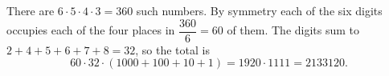 There are $6\cdot5\cdot4\cdot3=360$ such numbers. By symmetry each of the six digits occupies each of the four places in $\dfrac{360}{6}=60$ of them. The digits sum to $2+4+5+6+7+8=32$, so the total is
\[
60\cdot32\cdot(1000+100+10+1)=1920\cdot1111=\boxed{2133120}.
\]
